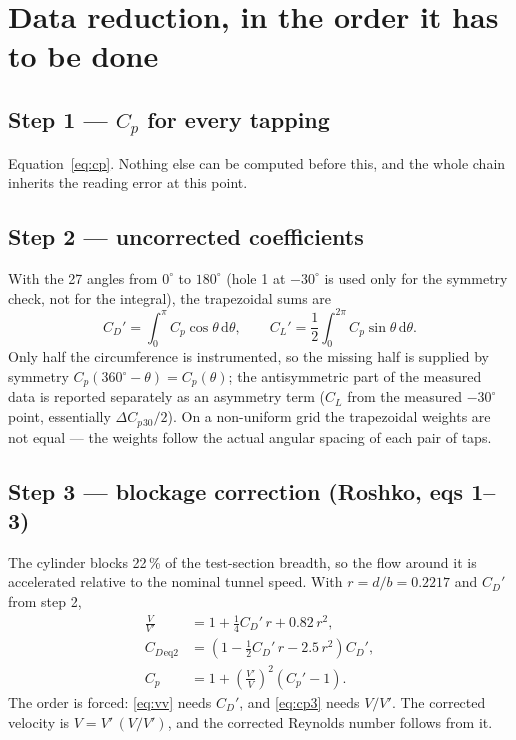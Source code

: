 \documentclass[11pt,a4paper]{article}
\newcommand{\Cp}{\ensuremath{C_p}}
\newcommand{\CD}{\ensuremath{C_D}}
\newcommand{\CL}{\ensuremath{C_L}}
\begin{document}
\section{Data reduction, in the order it has to be done}

\subsection{Step 1 --- \Cp{} for every tapping}

Equation~\eqref{eq:cp}. Nothing else can be computed before this, and the whole chain inherits
the reading error at this point.

\subsection{Step 2 --- uncorrected coefficients}

With the 27 angles from $0^\circ$ to $180^\circ$ (hole 1 at $-30^\circ$ is used only for the
symmetry check, not for the integral), the trapezoidal sums are
\begin{equation}
\CD' = \int_0^{\pi}\Cp\cos\theta\,\mathrm{d}\theta,\qquad
\CL' = \frac12\int_0^{2\pi}\Cp\sin\theta\,\mathrm{d}\theta .
\end{equation}
Only half the circumference is instrumented, so the missing half is supplied by symmetry
$\Cp(360^\circ-\theta) = \Cp(\theta)$; the antisymmetric part of the measured data is reported
separately as an asymmetry term ($\CL$ from the measured $-30^\circ$ point, essentially
$\Delta\Cp{}_{30}/2$). On a non-uniform grid the trapezoidal weights are not equal --- the
weights follow the actual angular spacing of each pair of taps.

\subsection{Step 3 --- blockage correction (Roshko, eqs 1--3)}

The cylinder blocks 22\,\% of the test-section breadth, so the flow around it is accelerated
relative to the nominal tunnel speed. With $r = d/b = 0.2217$ and $\CD'$ from step 2,
\begin{align}
\frac{V}{V'} &= 1 + \tfrac14 \CD'\,r + 0.82\,r^2, \label{eq:vv}\\
\CD{}_{\text{eq2}} &= \left(1 - \tfrac12 \CD'\, r - 2.5\,r^2\right)\CD', \label{eq:cd2}\\
\Cp &= 1 + \left(\frac{V'}{V}\right)^{2}\left(\Cp' - 1\right). \label{eq:cp3}
\end{align}
The order is forced: \eqref{eq:vv} needs $\CD'$, and \eqref{eq:cp3} needs $V/V'$. The corrected
velocity is $V = V'\,(V/V')$, and the corrected Reynolds number follows from it.
\end{document}
